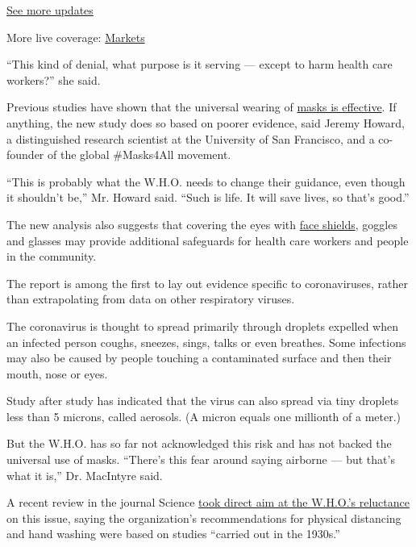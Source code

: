 \href{https://www.nytimes3xbfgragh.onion/2020/08/21/world/covid-19-coronavirus.html?action=click\&pgtype=Article\&state=default\&region=MAIN_CONTENT_1\&context=storylines_live_updates}{See
more updates}

More live coverage:
\href{https://www.nytimes3xbfgragh.onion/live/2020/08/21/business/stock-market-today-coronavirus?action=click\&pgtype=Article\&state=default\&region=MAIN_CONTENT_1\&context=storylines_live_updates}{Markets}

``This kind of denial, what purpose is it serving --- except to harm
health care workers?'' she said.

Previous studies have shown that the universal wearing of
\href{https://reliefweb.int/report/china/reduction-secondary-transmission-sars-cov-2-households-face-mask-use-disinfection-and}{masks
is effective}. If anything, the new study does so based on poorer
evidence, said Jeremy Howard, a distinguished research scientist at the
University of San Francisco, and a co-founder of the global \#Masks4All
movement.

``This is probably what the W.H.O. needs to change their guidance, even
though it shouldn't be,'' Mr. Howard said. ``Such is life. It will save
lives, so that's good.''

The new analysis also suggests that covering the eyes with
\href{https://www.nytimes3xbfgragh.onion/article/face-shield-mask-california-coronavirus.html}{face
shields}, goggles and glasses may provide additional safeguards for
health care workers and people in the community.

The report is among the first to lay out evidence specific to
coronaviruses, rather than extrapolating from data on other respiratory
viruses.

The coronavirus is thought to spread primarily through droplets expelled
when an infected person coughs, sneezes, sings, talks or even breathes.
Some infections may also be caused by people touching a contaminated
surface and then their mouth, nose or eyes.

Study after study has indicated that the virus can also spread via tiny
droplets less than 5 microns, called aerosols. (A micron equals one
millionth of a meter.)

But the W.H.O. has so far not acknowledged this risk and has not backed
the universal use of masks. ``There's this fear around saying airborne
--- but that's what it is,'' Dr. MacIntyre said.

A recent review in the journal Science
\href{https://science.sciencemag.org/content/early/2020/05/27/science.abc6197}{took
direct aim at the W.H.O.'s reluctance} on this issue, saying the
organization's recommendations for physical distancing and hand washing
were based on studies ``carried out in the 1930s.''

